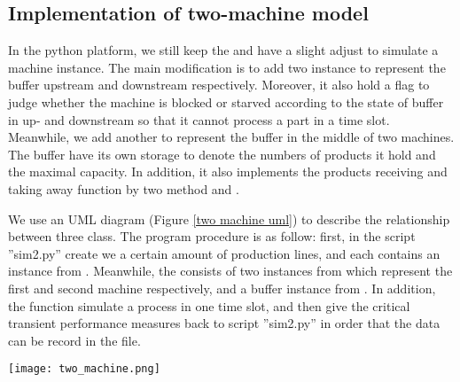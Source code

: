 \subsection{Implementation of two-machine model}
\label{c}
\noindent In the python platform, we still keep the  and have a slight adjust to simulate a machine instance. The main modification is to add two instance to represent the buffer upstream and downstream respectively. Moreover, it also hold a flag to judge whether the machine is blocked or starved according to the state of buffer in up- and downstream so that it cannot process a part in a time slot. Meanwhile, we add another  to represent the buffer in the middle of two machines. The buffer have its own storage to denote the numbers of products it hold and the maximal capacity. In addition, it also implements the products receiving and taking away function by two method  and .

We use an UML diagram (Figure \ref{two machine uml}) to describe the relationship between three class. The program procedure is as follow: first, in the script ''sim2.py'' create we a certain amount of production lines, and each contains an instance from . Meanwhile, the  consists of two instances from  which represent the first and second machine respectively, and a buffer instance from . In addition, the function  simulate a process in one time slot, and then give the critical transient performance measures back  to script ''sim2.py'' in order that the data can be record in the file.

\begin{figure*}[!h]
	\centering
	\texttt{[image: two\_machine.png]}
	\caption{UML diagram of a two-machine model}
	\label{two machine uml}
\end{figure*}